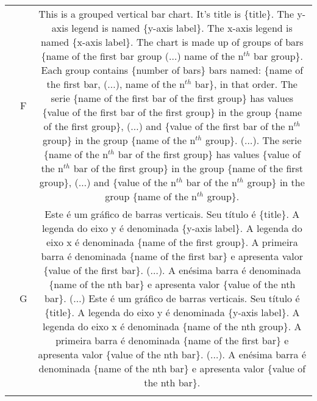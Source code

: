 \begin{table}[htbp]
\begin{tabular}{|c|c|c|}
& \multirow{6}{*}{F} & \multirow{6}{15cm}{This is a grouped vertical bar chart. It's title is \{title\}. The y-axis legend is named \{y-axis label\}. The x-axis legend is named \{x-axis label\}. The chart is made up of groups of bars \{name of the first bar group ($\ldots$) name of the n$^{th}$ bar group\}. Each group contains \{number of bars\} bars named: \{name of the first bar, ($\ldots$), name of the n$^{th}$ bar\}, in that order. The serie \{name of the first bar of the first group\} has values \{value of the first bar of the first group\} in the group \{name of the first group\}, ($\ldots$) and \{value of the first bar of the n$^{th}$ group\} in the group \{name of the n$^{th}$ group\}. ($\ldots$). The serie \{name of the n$^{th}$ bar of the first group\} has values \{value of the n$^{th}$ bar of the first group\} in the group \{name of the first group\}, ($\ldots$) and \{value of the n$^{th}$ bar of the n$^{th}$ group\} in the group \{name of the n$^{th}$ group\}.}\\
& &\\
& & \\
& &\\
& &\\
&  &\\ \cline{2-3}

\begin{comment}
& \multirow{6}{*}{G} & \multirow{6}{15cm}{Este é um gráfico de barras verticais. Seu título é \{title\}. A legenda do eixo y é denominada \{y-axis label\}. A legenda do eixo x é denominada \{name of the first group\}. A primeira barra é denominada \{name of the first bar\} e apresenta valor \{value of the first bar\}. ($\ldots$). A enésima barra é denominada \{name of the nth bar\} e apresenta valor \{value of the nth bar\}. ($\ldots$) Este é um gráfico de barras verticais. Seu título é \{title\}. A legenda do eixo y é denominada \{y-axis label\}. A legenda do eixo x é denominada \{name of the nth group\}. A primeira barra é denominada \{name of the first bar\} e apresenta valor \{value of the nth bar\}. ($\ldots$). A enésima barra é denominada \{name of the nth bar\} e apresenta valor \{value of the nth bar\}.}\\
& &\\
& & \\
& &\\
& &\\
& &\\
\end{comment}


\end{tabular}
\end{table}
